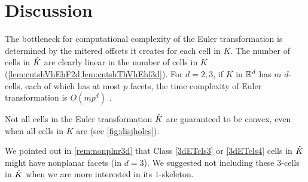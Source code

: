 \section{Discussion} \label{sec:disc}

The bottleneck for computational complexity of the Euler transformation is determined by the mitered offsets it creates for each cell in $K$.
The number of cells in $\hat{K}$ are clearly linear in the number of cells in $K$ (\cref{lem:cntshVhEhF2d,lem:cntshThVhEhf3d}).
For $d=2,3$, if $K$ in ${\mathbb R}^d$ has $m$ $d$-cells, each of which has at most $p$ facets, the time complexity of Euler transformation is $O(m p^d)$ \cite{AuWa2013,AuWa2016}.

Not all cells in the Euler transformation $\hat{K}$ are guaranteed to be convex, even when all cells in $K$ are (see \cref{fig:disjholes}).

We pointed out in \cref{rem:nonplnr3d} that Class \ref{3dETcls3} or \ref{3dETcls4} cells in $\hat{K}$ might have nonplanar facets (in $d=3$).
We suggested not including these $3$-cells in $\hat{K}$ when we are more interested in its $1$-skeleton.


